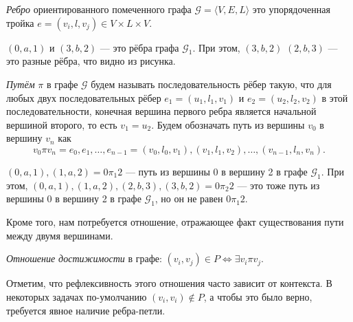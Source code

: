 \begin{definition}
  \textit{Ребро} ориентированного помеченного графа $\mathcal{G} = \langle V, E, L \rangle$ это упорядоченная тройка $e = (v_i,l,v_j) \in V \times L \times V$.
\end{definition}

\begin{example}
$(0,a,1)$  и $(3,b,2)$ --- это рёбра графа $\mathcal{G}_1$. При этом, $(3,b,2)$ $(2,b,3)$ --- это разные рёбра, что видно из рисунка.
\end{example}

\begin{definition}
  \textit{Путём} $\pi$ в графе $\mathcal{G}$ будем называть последовательность рёбер такую, что для любых двух последовательных рёбер $e_1=(u_1,l_1,v_1)$ и $e_2=(u_2,l_2,v_2)$ в этой последовательности, конечная вершина первого ребра является начальной вершиной второго, то есть $v_1 = u_2$. Будем обозначать путь из вершины $v_0$ в вершину $v_n$ как $$v_0 \pi v_n = e_0,e_1, \dots, e_{n-1} = (v_0, l_0, v_1),(v_1,l_1,v_2),\dots,(v_{n-1},l_n,v_n).$$

\begin{center}
  \end{center}
\end{definition}

\begin{example}
$(0,a,1),(1,a,2) = 0\pi_1 2$  --- путь из вершины 0 в вершину 2 в графе $\mathcal{G}_1$.
При этом, $(0,a,1),(1,a,2),(2,b,3),(3,b,2) = 0\pi_2 2$ --- это тоже путь из вершины 0 в вершину 2 в графе $\mathcal{G}_1$, но он не равен $0\pi_1 2$.
\end{example}

Кроме того, нам потребуется отношение, отражающее факт существования пути между двумя вершинами.

\begin{definition}\label{def:reach}
  \textit{Отношение достижимости} в графе:
  $(v_i,v_j) \in P \iff \exists v_i \pi v_j$.
\end{definition}

Отметим, что рефлексивность этого отношения часто зависит от контекста.
В некоторых задачах по-умолчанию $(v_i,v_i) \notin P$, а чтобы это было верно, требуется явное наличие ребра-петли.

